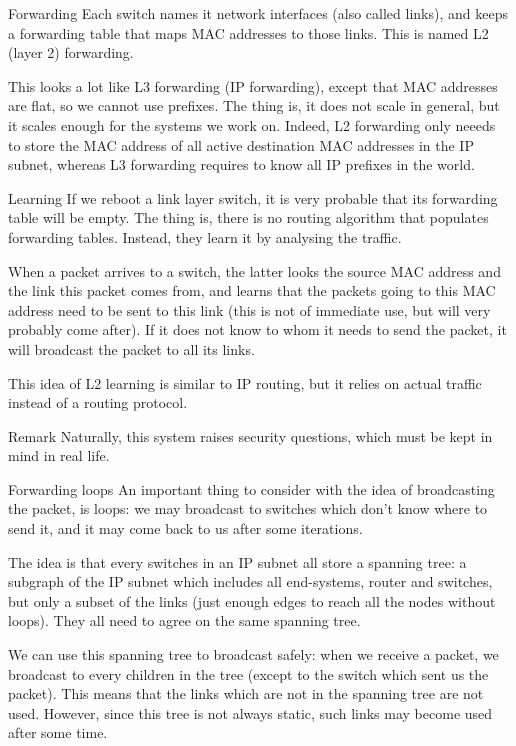\documentclass[a4paper]{article}
\begin{document}
\begin{parag}{Forwarding}
    Each switch names it network interfaces (also called links), and keeps a forwarding table that maps MAC addresses to those links. This is named L2 (layer 2) forwarding. 
     
    This looks a lot like L3 forwarding (IP forwarding), except that MAC addresses are flat, so we cannot use prefixes. The thing is, it does not scale in general, but it scales enough for the systems we work on. Indeed, L2 forwarding only neeeds to store the MAC address of all active destination MAC addresses in the IP subnet, whereas L3 forwarding requires to know all IP prefixes in the world.
\end{parag}

\begin{parag}{Learning}
    If we reboot a link layer switch, it is very probable that its forwarding table will be empty. The thing is, there is no routing algorithm that populates forwarding tables. Instead, they learn it by analysing the traffic.
    
    When a packet arrives to a switch, the latter looks the source MAC address and the link this packet comes from, and learns that the packets going to this MAC address need to be sent to this link (this is not of immediate use, but will very probably come after). If it does not know to whom it needs to send the packet, it will broadcast the packet to all its links.
    
    This idea of L2 learning is similar to IP routing, but it relies on actual traffic instead of a routing protocol.

    \begin{subparag}{Remark}
        Naturally, this system raises security questions, which must be kept in mind in real life.
    \end{subparag}
\end{parag}

\begin{parag}{Forwarding loops}
    An important thing to consider with the idea of broadcasting the packet, is loops: we may broadcast to switches which don't know where to send it, and it may come back to us after some iterations. 

    The idea is that every switches in an IP subnet all store a spanning tree: a subgraph of the IP subnet which includes all end-systems, router and switches, but only a subset of the links (just enough edges to reach all the nodes without loops). They all need to agree on the same spanning tree.

    We can use this spanning tree to broadcast safely: when we receive a packet, we broadcast to every children in the tree (except to the switch which sent us the packet). This means that the links which are not in the spanning tree are not used. However, since this tree is not always static, such links may become used after some time.
\end{parag}
\end{document}
